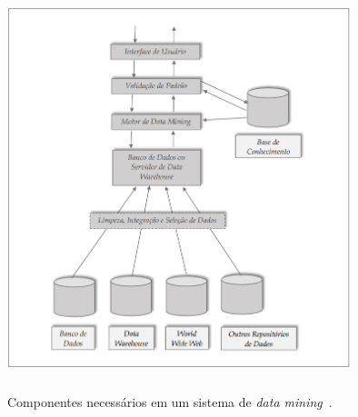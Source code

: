 \begin{figure}[!htb]
	\centering
	{\includegraphics[width=10cm, height=11cm]{images/componentes_mineracao}}
	\caption {Componentes necessários em um sistema de \textit{data mining}~\citep{han_kamber2006}.}
	\label{componentes}
\end{figure}

